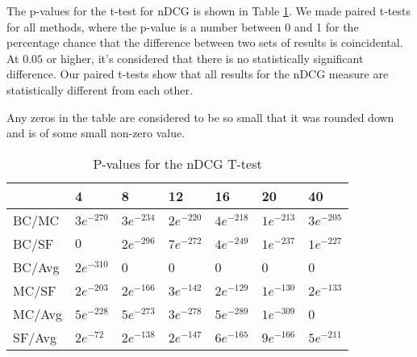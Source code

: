 The p-values for the t-test for nDCG is shown in Table \ref{tbl:ndcg_ttest}. We made paired t-tests for all methods, where the p-value is a number between 0 and 1 for the percentage chance that the difference between two sets of results is coincidental. At $0.05$ or higher, it's considered that there is no statistically significant difference. Our paired t-tests show that all results for the nDCG measure are statistically different from each other.

Any zeros in the table are considered to be so small that it was rounded down and is of some small non-zero value.

\begin{table}[H]
	\centering
	\begin{tabular}{|l|llllll|}\hline
		& 4 & 8 & 12 & 16 & 20 & 40 \\\hline
		BC/MC	& $3e^{-270}$	& $3e^{-234}$	& $2e^{-220}$	& $4e^{-218}$	& $1e^{-213}$ & $3e^{-205}$ \\
		BC/SF	& $0$	& $2e^{-296}$	& $7e^{-272}$	& $4e^{-249}$	& $1e^{-237}$ & $1e^{-227}$ \\
		BC/Avg	& $2e^{-310}$	& 0 & 0	& 0	& 0 & 0 \\
		MC/SF	& $2e^{-203}$	& $2e^{-166}$ 	& $3e^{-142}$	& $2e^{-129}$	& $1e^{-130}$ & $2e^{-133}$ \\
		MC/Avg	& $5e^{-228}$	& $5e^{-273}$ 	& $3e^{-278}$	& $5e^{-289}$	& $1e^{-309}$ & 0 \\
		SF/Avg	& $2e^{-72}$	& $2e^{-138}$ 	& $2e^{-147}$	& $6e^{-165}$	& $9e^{-166}$ & $5e^{-211}$ \\ \hline
	\end{tabular}
	\caption{P-values for the nDCG T-test}
	\label{tbl:ndcg_ttest}
\end{table}